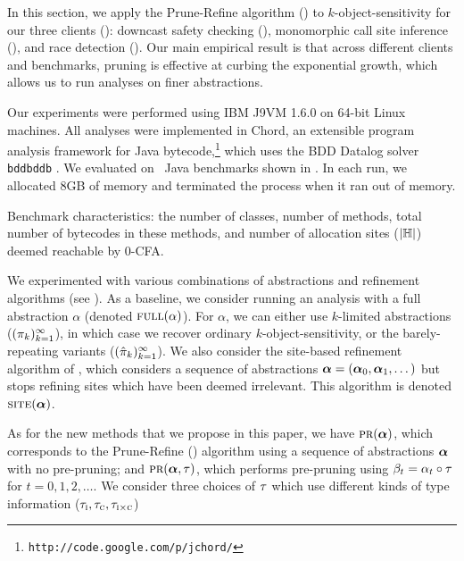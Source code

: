 
In this section, we apply the Prune-Refine algorithm () to
$k$-object-sensitivity for our three clients ():
downcast safety checking (\downcast),
monomorphic call site inference (\monosite),
and race detection (\race).
Our main empirical result is that across different clients and benchmarks,
pruning is effective at curbing the exponential growth,
which allows us to run analyses on finer abstractions.


Our experiments were performed using IBM J9VM 1.6.0 on 64-bit Linux machines.
All analyses were implemented in Chord,
an extensible program analysis framework for Java bytecode,\footnote{{\tt{http://code.google.com/p/jchord/}}}
which uses the BDD Datalog solver {\tt bddbddb} \cite{Whaley2007}.
We evaluated on \numBenchmarks\ Java benchmarks shown in .
In each run, we allocated 8GB of memory and terminated the process when it ran out of memory.

\begin{table*}
\centering

\caption{Benchmark characteristics:
the number of classes,
number of methods,
total number of bytecodes in these methods,
and number of allocation sites ($|{\mathbb H}|$)
deemed reachable by 0-CFA.
\label{tab:benchmarks}}
\end{table*}

We experimented with various combinations of abstractions and refinement
algorithms (see ).  As a baseline, we consider running an analysis
with a full abstraction $\alpha$ (denoted $\text{\sc full}(\alpha)$).
For $\alpha$, we can either use $k$-limited abstractions
($(\pi_k)_{k=1}^\infty$), in which case we recover ordinary $k$-object-sensitivity,
or the barely-repeating variants ($(\hat{\pi}_k)_{k=1}^\infty$).
We also consider the site-based refinement algorithm of \cite{liang11minimal},
which considers a sequence of abstractions $\mbox{\boldmath$\alpha$} = (\mbox{\boldmath$\alpha$}_0, \mbox{\boldmath$\alpha$}_1, \dots)$
but stops refining sites which have been deemed irrelevant.  This algorithm is denoted $\text{\sc site}(\mbox{\boldmath$\alpha$})$.

As for the new methods that we propose in this paper,
we have $\text{\sc pr}(\mbox{\boldmath$\alpha$})$, which corresponds to the Prune-Refine (\PR) algorithm using a sequence of abstractions $\mbox{\boldmath$\alpha$}$ with no pre-pruning;
and $\text{\sc pr}(\mbox{\boldmath$\alpha$},\tau)$, which performs pre-pruning using $\beta_t = \alpha_t
\circ \tau$ for $t = 0, 1, 2, \dots$.  We consider three choices of $\tau$
which use different kinds of type information ($\tau_{\text{\sc i}},\tau_{\text{\sc c}},\tau_{\text{\sc i} \times \text{\sc c}}$)

